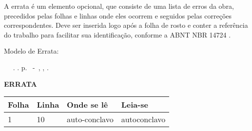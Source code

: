 \begin{errata}
	A errata é um elemento opcional, que consiste de uma lista de erros da obra, precedidos pelas folhas e linhas onde eles ocorrem e seguidos pelas correções correspondentes. Deve ser inserida logo após a folha de rosto e conter a referência do trabalho para facilitar sua identificação, conforme a ABNT NBR 14724 \cite{nbr14724}.
	
	Modelo de Errata:
		
	\begin{flushleft} 
			\setlength{\absparsep}{0pt} %
			\SingleSpacing 
			\imprimirautorabr~ ~\textbf{\imprimirtituloresumo}.	\imprimirdata. \pageref{LastPage}p. 
			\imprimirtipotrabalho~-~\imprimirinstituicao, \imprimirlocal, \imprimirdata. 
 	\end{flushleft}
\vspace{\onelineskip}
\OnehalfSpacing 
\center
\textbf{ERRATA}
\vspace{\onelineskip}
\OnehalfSpacing 
\begin{table}[htb]
	\center
	\footnotesize
	\begin{tabular}{p{2cm} p{2cm} p{4cm} p{4cm} }
		\hline
		\textbf{Folha} & \textbf{Linha}  & \textbf{Onde se lê}  & \textbf{Leia-se}  \\
			\hline
			1 & 10 & auto-conclavo & autoconclavo\\
		\hline
	\end{tabular}
\end{table}
\end{errata}
